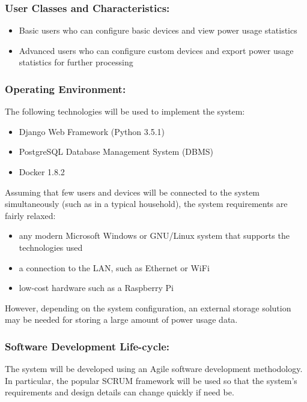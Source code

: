 \documentclass[10pt,twocolumn]{witseiepaper}
\begin{document}
	\subsubsection{User Classes and Characteristics:}
	\begin{itemize}
		\item Basic users who can configure basic devices and view power usage statistics
		\item Advanced users who can configure custom devices and export power usage statistics for further processing
	\end{itemize}
	
	\subsubsection{Operating Environment:}
	The following technologies will be used to implement the system:
	\begin{itemize}
		\item Django Web Framework (Python 3.5.1)
		\item PostgreSQL Database Management System (DBMS)
		\item Docker 1.8.2
	\end{itemize}
	Assuming that few users and devices will be connected to the system simultaneously (such as in a typical household), the system requirements are fairly relaxed:
	\begin{itemize}
		\item any modern Microsoft Windows or GNU/Linux system that supports the technologies used
		\item a connection to the LAN, such as Ethernet or WiFi
		\item low-cost hardware such as a Raspberry Pi
	\end{itemize}
	However, depending on the system configuration, an external storage solution may be needed for storing a large amount of power usage data.
	
	
	\subsubsection{Software Development Life-cycle:}
	The system will be developed using an Agile software development methodology. In particular, the popular SCRUM framework will be used so that the system's requirements and design details can change quickly if need be. 
	
\end{document}
